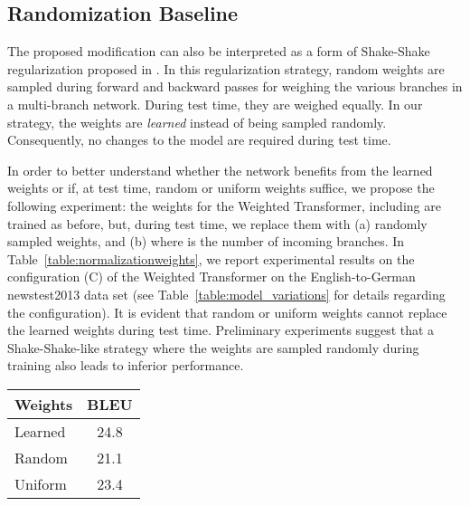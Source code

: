 \documentclass{article} \usepackage{iclr2018_conference,times}
\newcommand{\name}{Weighted Transformer\xspace}
\begin{document}
\subsection{Randomization Baseline}
The proposed modification can also be interpreted as a form of Shake-Shake regularization proposed in \cite{gastaldi2017shake}. In this regularization strategy, random weights are sampled during forward and backward passes for weighing the various branches in a multi-branch network. During test time, they are weighed equally. In our strategy, the weights are \textit{learned} instead of being sampled randomly. Consequently, no changes to the model are required during test time.

In order to better understand whether the network benefits from the learned weights or if, at test time, random or uniform weights suffice, we propose the following experiment: the weights for the \name, including  are trained as before, but, during test time, we replace them with (a) randomly sampled weights, and (b)  where  is the number of incoming branches. In Table~\ref{table:normalizationweights}, we report experimental results on the configuration (C) of the \name on the English-to-German newstest2013 data set (see Table~\ref{table:model_variations} for details regarding the configuration). It is evident that random or uniform weights cannot replace the learned weights during test time. Preliminary experiments suggest that a Shake-Shake-like strategy where the weights are sampled randomly during training also leads to inferior performance.

\begin{table*}
\center
\begin{tabular}{l|c}
\toprule
\bf Weights  & \bf BLEU \\
\midrule
Learned & 24.8 \\ 
Random & 21.1 \\ 
Uniform & 23.4 \\ 
\end{tabular}
\caption{
Performance of the architecture with random and uniform normalization weights on the newstest2013 English-to-German task for configuration (C). This shows that the learned  weights of the \name are crucial to its performance.
}
\label{table:normalizationweights}
\end{table*}
\end{document}
